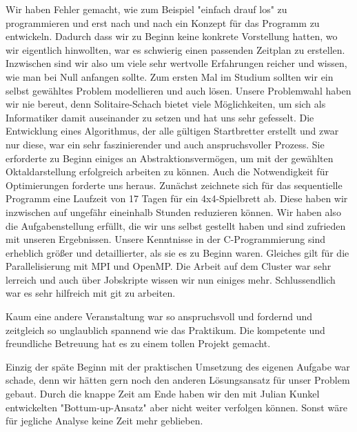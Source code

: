 \documentclass[
	12pt,
	a4paper,
	BCOR10mm,
	DIV14,
	listof=totoc,
	bibliography=totoc,
	headsepline
]{scrreprt}
\begin{document}
Wir haben Fehler gemacht, wie zum Beispiel "einfach drauf los" zu programmieren und erst nach und nach ein Konzept für das Programm zu entwickeln. Dadurch dass wir zu Beginn keine konkrete Vorstellung hatten, wo wir eigentlich hinwollten, war es schwierig einen passenden Zeitplan zu erstellen. 
Inzwischen sind wir also um viele sehr wertvolle Erfahrungen reicher und wissen, wie man bei Null anfangen sollte. 
Zum ersten Mal im Studium sollten wir ein selbst gewähltes Problem modellieren und auch lösen.
Unsere Problemwahl haben wir nie bereut, denn Solitaire-Schach bietet viele Möglichkeiten, um sich als Informatiker damit auseinander zu setzen und hat uns sehr gefesselt.
Die Entwicklung eines Algorithmus, der alle gültigen Startbretter erstellt und zwar nur diese, war ein sehr faszinierender und auch anspruchsvoller Prozess. Sie erforderte zu Beginn einiges an Abstraktionsvermögen, um mit der gewählten Oktaldarstellung erfolgreich arbeiten zu können.
Auch die Notwendigkeit für Optimierungen forderte uns heraus. Zunächst zeichnete sich für das sequentielle Programm eine Laufzeit von 17 Tagen für ein 4x4-Spielbrett ab. 
Diese haben wir inzwischen auf ungefähr eineinhalb Stunden reduzieren können. 
Wir haben also die Aufgabenstellung erfüllt, die wir uns selbst gestellt haben und sind zufrieden mit unseren Ergebnissen.
Unsere Kenntnisse in der C-Programmierung sind erheblich größer und detaillierter, als sie es zu Beginn waren. Gleiches gilt für die Parallelisierung mit MPI und OpenMP.
Die Arbeit auf dem Cluster war sehr lerreich und auch über Jobskripte wissen wir nun einiges mehr. Schlussendlich war es sehr hilfreich mit git zu arbeiten.

Kaum eine andere Veranstaltung war so anspruchsvoll und fordernd und zeitgleich so unglaublich spannend wie das Praktikum.
Die kompetente und freundliche Betreuung hat es zu einem tollen Projekt gemacht.

Einzig der späte Beginn mit der praktischen Umsetzung des eigenen Aufgabe war schade, denn wir hätten gern noch den anderen Lösungsansatz für unser Problem gebaut.
Durch die knappe Zeit am Ende haben wir den mit Julian Kunkel entwickelten "Bottum-up-Ansatz" aber nicht weiter verfolgen können. Sonst wäre für jegliche Analyse keine Zeit mehr geblieben.
 
\end{document}
